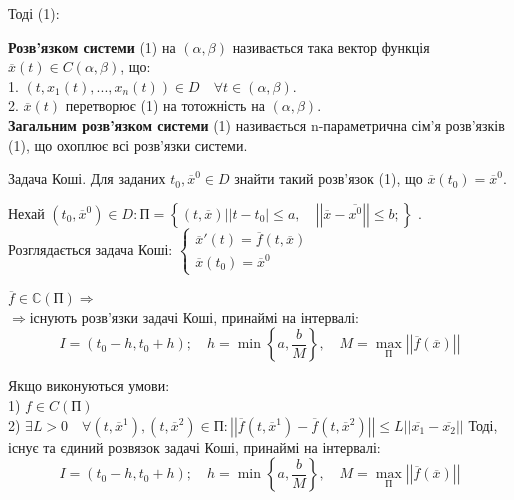 \documentclass[14pt,a4paper]{scrartcl}
\theoremstyle{definition}
\theoremstyle{remark}
\theoremstyle{definition}
\theoremstyle{definition}
\begin{document}
Тоді (1): 
\ed

\def\rect{\textbf{П}}
\bd
\textbf{Розв'язком системи } (1) на $(\alpha , \beta)$ називається така вектор функція $\overline{x} (t) \in C(\alpha , \beta)$, що:\\
1. $(t, x_1 (t), ..., x_n(t))  \in D \quad \forall t \in (\alpha , \beta)$. \\
2. $ \overline{x} (t)$ перетворює (1) на тотожність на $(\alpha , \beta)$. \\
\textbf{Загальним розв'язком системи}  (1) називається n-параметрична сім'я розв'язків (1), що охоплює всі розв'язки системи.
\ed

Задача Коші. Для заданих $t_0, \overline{x}^{0} \in D$ знайти такий розв'язок (1), що $\overline{x} (t_0) = \overline{x}^{0}$.

Нехай $(t_0 , \overline{x}^0) \in D :  \textbf{П} = \left\lbrace (t, \overline{x}) \bigg |
 \left| t - t_0 \right| \leq a, \quad
 \left| \left| \overline{x} - \overline{x^{0}} \right|  \right| \leq  b;
 \right\rbrace $ .\\
 Розглядається задача Коші: $\begin{cases}
      \overline{x} ' (t)  =  \overline{f} (t, \overline{x}) \\
      \overline{x} (t_0) = \overline{x}^0
 \end{cases}$
\begin{boxteo}
$\overline{f} \in \mathbb{C} (\rect) \Longrightarrow $\\$  \Longrightarrow $існують розв'язки задачі Коші, принаймі на інтервалі: $$ I = (t_0 - h, t_0 + h); \quad h = \min{\left\lbrace a , \frac{b}{M}  \right\rbrace }, \quad M = \max_{\rect} \left| \left| \overline{f} (\overline{x}) \right|  \right| $$
\end{boxteo}
\begin{boxteo} Якщо виконуються умови:\\
    1) $f \in C (\rect)$ \\
    2) $ \exists L > 0 \quad \forall (t, \overline{x}^1 ), (t, \overline{x} ^2) \in \rect  :
    \left| \left| \overline{f} (t, \overline{x}^1) - \overline{f} (t, \overline{x}^2)  \right|   \right|  \leq  L \left|  \left| \overline{x_1} - \overline{x_2} \right|  \right| $
    Тоді, існує та єдиний розвязок задачі Коші, принаймі на інтервалі: $$ I = (t_0 - h, t_0 + h); \quad h = \min{\left\lbrace a , \frac{b}{M}  \right\rbrace }, \quad M = \max_{\rect} \left| \left| \overline{f} (\overline{x}) \right|  \right| $$
\end{boxteo}
\end{document}
